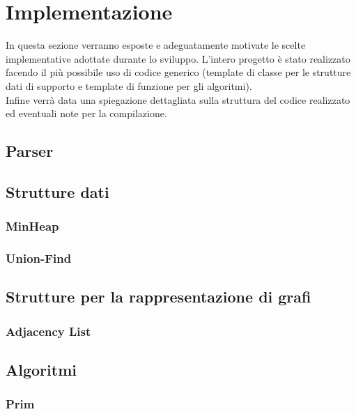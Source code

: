 \documentclass[]{article}
\begin{document}
\section{Implementazione}
In questa sezione verranno esposte e adeguatamente motivate le scelte implementative adottate durante lo sviluppo. L'intero progetto è stato realizzato facendo il più possibile uso di codice generico (template di classe per le strutture dati di supporto e template di funzione per gli algoritmi).\\
Infine verrà data una spiegazione dettagliata sulla struttura del codice realizzato ed eventuali note per la compilazione.
\subsection{Parser}
\subsection{Strutture dati}
\subsubsection{MinHeap}
\subsubsection{Union-Find}
\subsection{Strutture per la rappresentazione di grafi}
\subsubsection{Adjacency List}
\subsection{Algoritmi}
\subsubsection{Prim}
\newpage
\end{document}
